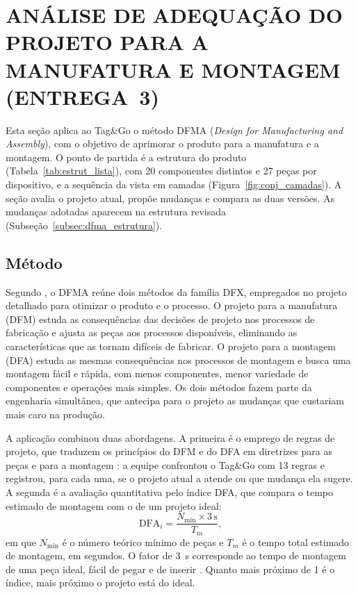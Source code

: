 \section{ANÁLISE DE ADEQUAÇÃO DO PROJETO PARA A MANUFATURA E MONTAGEM (ENTREGA~3)}\label{sec:dfma}


Esta seção aplica ao Tag\&Go o método DFMA (\textit{Design for Manufacturing and Assembly}), com o objetivo de aprimorar o produto para a manufatura e a montagem. O ponto de partida é a estrutura do produto (Tabela~\ref{tab:estrut_lista}), com 20 componentes distintos e 27 peças por dispositivo, e a sequência da vista em camadas (Figura~\ref{fig:conj_camadas}). A seção avalia o projeto atual, propõe mudanças e compara as duas versões. As mudanças adotadas aparecem na estrutura revisada (Subseção~\ref{subsec:dfma_estrutura}).

\subsection{Método}
\label{subsec:dfma_metodo}

Segundo , o DFMA reúne dois métodos da família DFX, empregados no projeto detalhado para otimizar o produto e o processo. O projeto para a manufatura (DFM) estuda as consequências das decisões de projeto nos processos de fabricação e ajusta as peças aos processos disponíveis, eliminando as características que as tornam difíceis de fabricar. O projeto para a montagem (DFA) estuda as mesmas consequências nos processos de montagem e busca uma montagem fácil e rápida, com menos componentes, menor variedade de componentes e operações mais simples. Os dois métodos fazem parte da engenharia simultânea, que antecipa para o projeto as mudanças que custariam mais caro na produção.

A aplicação combinou duas abordagens. A primeira é o emprego de regras de projeto, que traduzem os princípios do DFM e do DFA em diretrizes para as peças e para a montagem \cite{rozenfeld2006gestao}: a equipe confrontou o Tag\&Go com 13 regras e registrou, para cada uma, se o projeto atual a atende ou que mudança ela sugere. A segunda é a avaliação quantitativa pelo índice DFA, que compara o tempo estimado de montagem com o de um projeto ideal:
\begin{equation}
\mathrm{DFA}_i = \frac{N_{\min} \times 3\,\text{s}}{T_m},
\label{eq:dfa_indice}
\end{equation}
em que $N_{\min}$ é o número teórico mínimo de peças e $T_m$ é o tempo total estimado de montagem, em segundos. O fator de 3~s corresponde ao tempo de montagem de uma peça ideal, fácil de pegar e de inserir \cite{boothroyd2011product}. Quanto mais próximo de 1 é o índice, mais próximo o projeto está do ideal.

